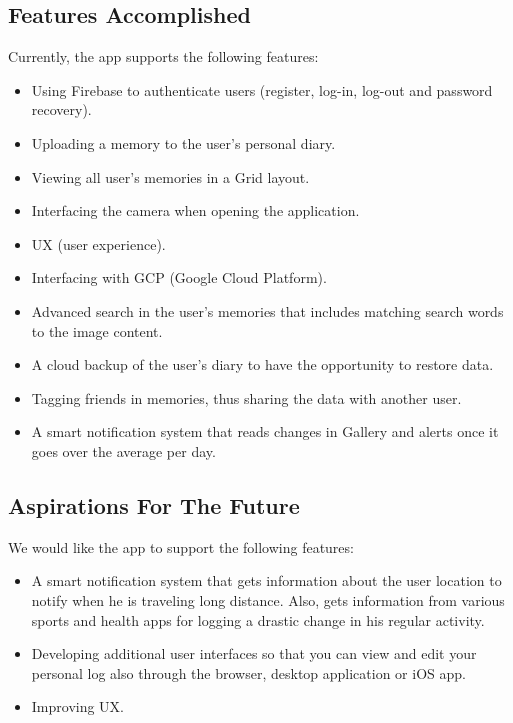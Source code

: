 \documentclass{article}
\begin{document}
\subsection{Features Accomplished}
Currently, the app supports the following features:
\begin{itemize}
 \item Using Firebase to authenticate users (register, log-in, log-out and password recovery).
 \item Uploading a memory to the user's personal diary.
 \item Viewing all user's memories in a Grid layout.
 \item Interfacing the camera when opening the application.
 \item UX (user experience).
 \item Interfacing with GCP (Google Cloud Platform).
 \item Advanced search in the user's memories that includes matching search words to the image content.
\item A cloud backup of the user's diary to have the opportunity to restore data.
\item Tagging friends in memories, thus sharing the data with another user.
\item A smart notification system that reads changes in Gallery and alerts once it goes over the average per day.
\end{itemize}

\subsection{Aspirations For The Future}
We would like the app to support the following features:
\begin{itemize}
\item A smart notification system that gets information about the user location to notify when he is traveling long distance. Also, gets information from various sports and health apps for logging a drastic change in his regular activity.
\item Developing additional user interfaces so that you can view and edit your personal log also through the browser, desktop application or iOS app.
\item Improving UX.
\end{itemize}
\end{document}
